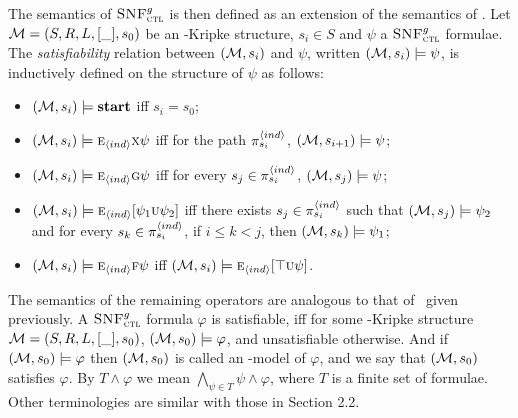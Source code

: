 \documentclass[letterpaper]{article}
\begin{document}
The semantics of ${\textsc{SNF}_{\textsc{ctl}}^g}$ is then
defined as an extension of the semantics of \CTL. 
Let ${\cal M}=(S,R,L,[\_],s_0)$ be an \Ind-Kripke structure, $s_i\in S$ and $\psi$ a ${\textsc{SNF}_{\textsc{ctl}}^g}$ formulae.
The {\em satisfiability} relation between $({\cal M},s_i)$ and $\psi$,
written $({\cal M},s_i)\models\psi$, is inductively defined on the structure of $\psi$ as follows:
\begin{itemize}
  \item $({\cal M},s_i) \models \textbf{start}$ iff $s_i=s_0$;
  \item $({\cal M},s_i)\models \textsc{e}_{{\langle{ind}\rangle}} \textsc{x} \psi$ iff for the path $\pi_{s_i}^{{\langle{ind}\rangle}}$, $({\cal M}, s_{i+1})\models \psi$;
  \item $({\cal M},s_i)\models \textsc{e}_{{\langle{ind}\rangle}}\textsc{g}\psi$ iff
    for every $s_j \in \pi_{s_i}^{{\langle{ind}\rangle}}$,
    $({\cal M},s_j) \models \psi$;
  \item $({\cal M},s_i)\models \textsc{e}_{{\langle{ind}\rangle}}[\psi_1\textsc{u}\psi_2]$ iff
      there exists $s_j\in \pi_{s_i}^{{\langle{ind}\rangle}}$ such that $({\cal M},s_j) \models \psi_2$ and for every $s_k \in \pi_{s_i}^{{\langle{ind}\rangle}}$, if $i\leq k < j$, then $({\cal M},s_k) \models \psi_1$;
  \item $({\cal M},s_i) \models \textsc{e}_{{\langle{ind}\rangle}} \textsc{f} \psi$ iff $({\cal M},s_i) \models \textsc{e}_{{\langle{ind}\rangle}}[\top \textsc{u}\psi]$.
\end{itemize}
The semantics of the remaining operators are analogous to that of \CTL\ given previously.
A ${\textsc{SNF}_{\textsc{ctl}}^g}$ formula $\varphi$ is satisfiable, iff for some \Ind-Kripke structure ${\cal M}=(S,R,L,[\_],s_0)$, $({\cal M},s_0)\models \varphi$, and unsatisfiable otherwise. And if $({\cal M},s_0)\models \varphi$ then $({\cal M},s_0)$ is called an \Ind-model of $\varphi$, and we say that $({\cal M},s_0)$ satisfies $\varphi$.
By $T \wedge \varphi$ we mean $\bigwedge_{\psi\in T} \psi \wedge \varphi$, where $T$ is a finite set of formulae.
Other terminologies are similar with those in Section 2.2.
\end{document}
